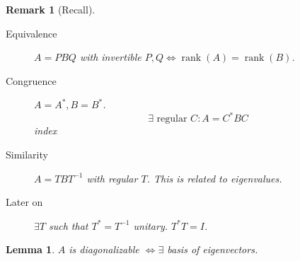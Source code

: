 \documentclass{article}
\newtheorem{lemma}{Lemma}  \numberwithin{lemma}{section}
\newtheorem{remark}{Remark}  \numberwithin{remark}{section}
\DeclareMathOperator{\rank}{rank}
\begin{document}
\begin{remark}[Recall]\hfill{}
  \begin{description}
    \item[Equivalence] $A = PBQ$ with invertible $P,Q \iff \rank(A) = \rank(B)$.
    \item[Congruence]
      $A = A^*, B = B^*$.
      \[ \exists \text{ regular } C: A = C^* BC \]
      index
    \item[Similarity] $A = TBT^{-1}$ with regular $T$. This is related to eigenvalues.
    \item[Later on] $\exists T$ such that $T^* = T^{-1}$ unitary. $T^{*} T = I$.
  \end{description}
\end{remark}

\begin{lemma} %
  $A$ is diagonalizable $\iff \exists$ basis of eigenvectors.
\end{lemma}
\end{document}
